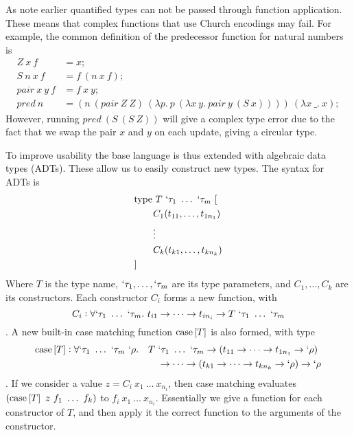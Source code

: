 \documentclass[12pt]{article}
\newcommand{\thmcase}[1]{\mathrm{case}\sbr{#1}}
\begin{document}
As note earlier quantified types can not be passed through function
application.
These means that complex functions that use Church encodings may fail.
For example, the common definition of the predecessor function for
natural numbers is
\begin{align*}
Z~x~f &= x;\\
S~n~x~f &= f~(n~x~f);\\
pair~x~y~f &= f~x~y;\\
pred~n &= (n~(pair~Z~Z)~(\lambda p.~p~(\lambda x~y.~pair~y~(S~x))))~(\lambda x~\_.~x);
\end{align*}
However, running $pred~(S~(S~Z))$ will give a complex type error due
to the fact that we swap the pair $x$ and $y$ on each update, giving
a circular type.

To improve usability the base language is thus extended with algebraic
data types (ADTs).
These allow us to easily construct new types.
The syntax for ADTs is
\begin{align*}
  &\mathrm{type}~T~`\tau_1~\ldots~`\tau_m~[\\
  &\qquad C_1(t_{11}, \ldots, t_{1n_1})\\
  &\qquad \vdots\\
  &\qquad C_k(t_{k1}, \ldots, t_{kn_k})\\
  &]
\end{align*}
Where $T$ is the type name, $`\tau_1, \ldots, `\tau_m$ are its type
parameters, and $C_1,\ldots,C_k$ are its constructors.
Each constructor $C_i$ forms a new function, with
$$C_i : \forall `\tau_1~\ldots~`\tau_m.~t_{i1} \to \cdots \to t_{in_i} \to T~`\tau_1~\ldots~`\tau_m$$.
A new built-in case matching function $\thmcase{T}$ is also formed,
with type
\begin{align*}
  \thmcase{T} : \forall `\tau_1~\ldots~`\tau_m~`\rho.
  &\quad T~`\tau_1~\ldots~`\tau_m \to (t_{11} \to \cdots \to t_{1n_1} \to `\rho)\\
  &\qquad \to \cdots \to (t_{k1} \to \cdots \to t_{kn_k} \to `\rho) \to `\rho
\end{align*}.
If we consider a value $z = C_i~x_1~\ldots~x_{n_i}$, then case matching
evaluates $(\thmcase{T}~z~f_1~\ldots~f_k)$ to $f_i~x_1~\ldots~x_{n_i}$.
Essentially we give a function for each constructor of $T$, and then
apply it the correct function to the arguments of the constructor.
\end{document}
